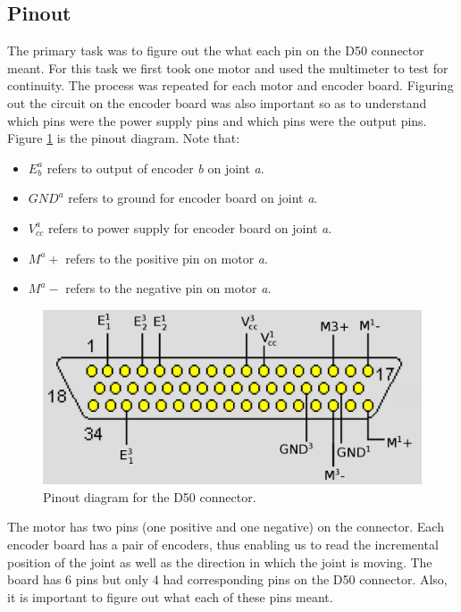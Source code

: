 \documentclass[10pt,a4paper]{article}
\begin{document}
\subsection{Pinout}
The primary task was to figure out the what each pin on the D50
connector meant. For this task we first took one motor and used the
multimeter to test for continuity. The process was repeated for each
motor and encoder board. Figuring out the circuit on the encoder board
was also important so as to understand which pins were the power
supply pins and which pins were the output pins.\\
\newpage
Figure \ref{fig:dsub} is the pinout diagram. Note
that: \begin{itemize} 
\item \( E^a_b \) refers to output of encoder \textit{b} on joint \textit{a}.
\item \( GND^a \) refers to ground for encoder board on joint \textit{a}.
\item \( V^a_{cc} \) refers to power supply for encoder board on joint
\textit{a}.
\item \( M^a+ \) refers to the positive pin on motor \textit{a}.
\item \( M^a- \) refers to the negative pin on motor \textit{a}.
\end{itemize}

\begin{figure}[h]
    \centering
    \includegraphics[scale=0.3]{dsub50.png}
    \caption{Pinout diagram for the D50 connector.}
    \label{fig:dsub}
\end{figure}

The motor has two pins (one positive and one negative) on the
connector. Each encoder board has a pair of encoders, thus enabling us
to read the incremental position of the joint as well as the direction
in which the joint is moving. The board has 6 pins but only 4 had
corresponding pins on the D50 connector. Also, it is important to
figure out what each of these pins meant.\\
\end{document}
